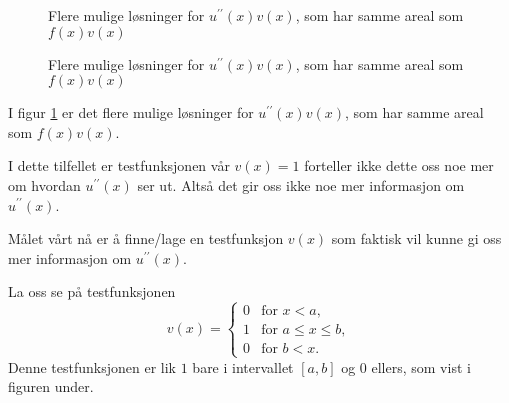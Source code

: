 \documentclass[../main.tex]{subfiles}
\begin{document}
\begin{figure}[H]
\begin{minipage}{0.48\textwidth}
        \caption{Flere mulige løsninger for $u^{\prime\prime}(x)v(x)$, som har samme areal som $f(x)v(x)$}
    \end{minipage}
    \caption{Flere mulige løsninger for $u^{\prime\prime}(x)v(x)$, som har samme areal som $f(x)v(x)$}
    \label{ex:svak_formulering}
\end{figure}

I figur \ref{ex:svak_formulering} er det flere mulige løsninger for $u^{\prime\prime}(x)v(x)$, som har samme areal som $f(x)v(x)$.

I dette tilfellet er testfunksjonen vår $v(x) = 1$ forteller ikke dette oss noe mer om hvordan $u^{\prime\prime}(x)$ ser ut.
Altså det gir oss ikke noe mer informasjon om $u^{\prime\prime}(x)$.

Målet vårt nå er å finne/lage en testfunksjon $v(x)$ som faktisk vil kunne gi oss mer informasjon om $u^{\prime\prime}(x)$.

La oss se på testfunksjonen
\[
    v(x) =
    \begin{cases}
        0 & \text{for } x < a,           \\
        1 & \text{for } a \leq x \leq b, \\
        0 & \text{for } b < x.
    \end{cases}
\]
Denne testfunksjonen er lik $1$ bare i intervallet $[a,b]$ og $0$ ellers, som vist i figuren under.


\end{document}
